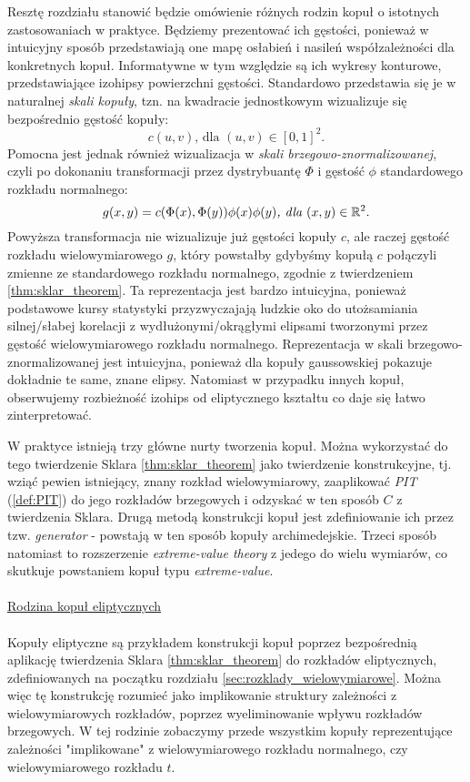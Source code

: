 Resztę rozdziału stanowić będzie omówienie różnych rodzin kopuł o istotnych zastosowaniach w praktyce. Będziemy prezentować ich gęstości, ponieważ w intuicyjny sposób przedstawiają one mapę osłabień i nasileń współzależności dla konkretnych kopuł. Informatywne w tym względzie są ich wykresy konturowe, przedstawiające izohipsy powierzchni gęstości. Standardowo przedstawia się je w naturalnej \emph{skali kopuły}, tzn. na kwadracie jednostkowym wizualizuje się bezpośrednio gęstość kopuły:
$$ c(u, v)\text{, dla } (u, v) \in [0, 1]^2.$$
Pomocna jest jednak również wizualizacja w \emph{skali brzegowo-znormalizowanej}, czyli po dokonaniu transformacji przez dystrybuantę $\Phi$ i gęstość $\phi$ standardowego rozkładu normalnego:
 $$ g(x, y) = c(\Phi(x), \Phi(y))\phi(x)\phi(y)\textit{, dla }(x,y)\in\mathbb{R}^2.$$
Powyższa transformacja nie wizualizuje już gęstości kopuły $c$, ale raczej gęstość rozkładu wielowymiarowego $g$, który powstałby gdybyśmy kopułą $c$ połączyli zmienne ze standardowego rozkładu normalnego, zgodnie z twierdzeniem \ref{thm:sklar_theorem}. Ta reprezentacja jest bardzo intuicyjna, ponieważ podstawowe kursy statystyki przyzwyczajają ludzkie oko do utożsamiania silnej/słabej korelacji z wydłużonymi/okrągłymi elipsami tworzonymi przez gęstość wielowymiarowego rozkładu normalnego. Reprezentacja w skali brzegowo-znormalizowanej jest intuicyjna, ponieważ dla kopuły gaussowskiej pokazuje dokładnie te same, znane elipsy. Natomiast w przypadku innych kopuł, obserwujemy rozbieżność izohips od eliptycznego kształtu co daje się łatwo zinterpretować. 

W praktyce istnieją trzy główne nurty tworzenia kopuł. Można wykorzystać do tego twierdzenie Sklara \ref{thm:sklar_theorem} jako twierdzenie konstrukcyjne, tj. wziąć pewien istniejący, znany rozkład wielowymiarowy, zaaplikować \emph{PIT} (\ref{def:PIT}) do jego rozkładów brzegowych i odzyskać w ten sposób $C$ z twierdzenia Sklara. Drugą metodą konstrukcji kopuł jest zdefiniowanie ich przez tzw. \emph{generator} - powstają w ten sposób kopuły archimedejskie. Trzeci sposób natomiast to rozszerzenie \emph{extreme-value theory} z jedego do wielu wymiarów, co skutkuje powstaniem kopuł typu \emph{extreme-value}.\\
\\
\underline{Rodzina kopuł eliptycznych}\\
\\
Kopuły eliptyczne są przykładem konstrukcji kopuł poprzez bezpośrednią aplikację twierdzenia Sklara \ref{thm:sklar_theorem} do rozkładów eliptycznych, zdefiniowanych na początku rozdziału \ref{sec:rozklady_wielowymiarowe}. Można więc tę konstrukcję rozumieć jako implikowanie struktury zależności z wielowymiarowych rozkładów, poprzez wyeliminowanie wpływu rozkładów brzegowych. W tej rodzinie zobaczymy przede wszystkim kopuły reprezentujące zależności "implikowane" z wielowymiarowego rozkładu normalnego, czy wielowymiarowego rozkładu $t$.

